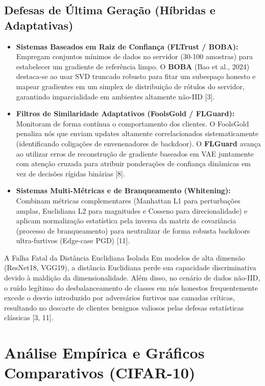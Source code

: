 \documentclass[11pt,a4paper]{article}
\begin{document}
\subsection{Defesas de Última Geração (Híbridas e Adaptativas)}
\begin{itemize}
\item \textbf{Sistemas Baseados em Raiz de Confiança (FLTrust / BOBA):} Empregam conjuntos mínimos de dados no servidor (30-100 amostras) para estabelecer um gradiente de referência limpo. O \textbf{BOBA} (Bao et al., 2024) destaca-se ao usar SVD truncado robusto para fitar um subespaço honesto e mapear gradientes em um simplex de distribuição de rótulos do servidor, garantindo imparcialidade em ambientes altamente não-IID [3].
\item \textbf{Filtros de Similaridade Adaptativos (FoolsGold / FLGuard):} Monitoram de forma contínua o comportamento dos clientes. O FoolsGold penaliza nós que enviam updates altamente correlacionados sistematicamente (identificando coligações de envenenadores de backdoor). O \textbf{FLGuard} avança ao utilizar erros de reconstrução de gradiente baseados em VAE juntamente com atenção cruzada para atribuir ponderações de confiança dinâmicas em vez de decisões rígidas binárias [8].
\item \textbf{Sistemas Multi-Métricas e de Branqueamento (Whitening):} Combinam métricas complementares (Manhattan L1 para perturbações amplas, Euclidiana L2 para magnitudes e Cosseno para direcionalidade) e aplicam normalização estatística pela inversa da matriz de covariância (processo de branqueamento) para neutralizar de forma robusta backdoors ultra-furtivos (Edge-case PGD) [11].
\end{itemize}

\begin{alertbox}{A Falha Fatal da Distância Euclidiana Isolada}
Em modelos de alta dimensão (ResNet18, VGG19), a distância Euclidiana perde sua capacidade discriminativa devido à maldição da dimensionalidade. Além disso, no cenário de dados não-IID, o ruído legítimo do desbalanceamento de classes em nós honestos frequentemente excede o desvio introduzido por adversários furtivos nas camadas críticas, resultando no descarte de clientes benignos valiosos pelas defesas estatísticas clássicas [3, 11].
\end{alertbox}

\section{Análise Empírica e Gráficos Comparativos (CIFAR-10)}
\end{document}

